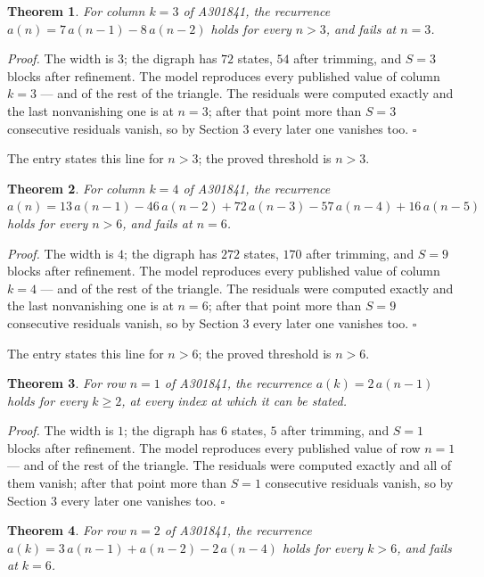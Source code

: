 \documentclass[11pt]{article}
\newtheorem{theorem}{Theorem}
\theoremstyle{definition}
\begin{document}
\begin{theorem} For column $k = 3$ of A301841, the recurrence $a(n) = 7\,a(n-1) - 8\,a(n-2)$ holds for every $n > 3$, and fails at $n = 3$.\end{theorem}

{\itshape Proof.} The width is $3$; the digraph has $72$ states, $54$ after trimming, and $S = 3$ blocks after refinement. The model reproduces every published value of column $k = 3$ --- and of the rest of the triangle. The residuals were computed exactly and the last nonvanishing one is at $n = 3$; after that point more than $S = 3$ consecutive residuals vanish, so by Section 3 every later one vanishes too. $\square$

The entry states this line for $n > 3$; the proved threshold is $n > 3$.

\begin{theorem} For column $k = 4$ of A301841, the recurrence $a(n) = 13\,a(n-1) - 46\,a(n-2) + 72\,a(n-3) - 57\,a(n-4) + 16\,a(n-5)$ holds for every $n > 6$, and fails at $n = 6$.\end{theorem}

{\itshape Proof.} The width is $4$; the digraph has $272$ states, $170$ after trimming, and $S = 9$ blocks after refinement. The model reproduces every published value of column $k = 4$ --- and of the rest of the triangle. The residuals were computed exactly and the last nonvanishing one is at $n = 6$; after that point more than $S = 9$ consecutive residuals vanish, so by Section 3 every later one vanishes too. $\square$

The entry states this line for $n > 6$; the proved threshold is $n > 6$.

\begin{theorem} For row $n = 1$ of A301841, the recurrence $a(k) = 2\,a(n-1)$ holds for every $k \ge 2$, at every index at which it can be stated.\end{theorem}

{\itshape Proof.} The width is $1$; the digraph has $6$ states, $5$ after trimming, and $S = 1$ blocks after refinement. The model reproduces every published value of row $n = 1$ --- and of the rest of the triangle. The residuals were computed exactly and all of them vanish; after that point more than $S = 1$ consecutive residuals vanish, so by Section 3 every later one vanishes too. $\square$

\begin{theorem} For row $n = 2$ of A301841, the recurrence $a(k) = 3\,a(n-1) + a(n-2) - 2\,a(n-4)$ holds for every $k > 6$, and fails at $k = 6$.\end{theorem}
\end{document}

